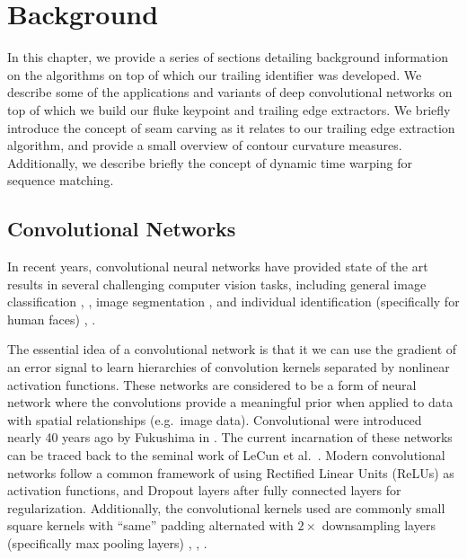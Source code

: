  
\chapter{Background} \label{sec:background}

In this chapter, we provide a series of sections detailing background information on the algorithms on top of which our trailing identifier was developed.
We describe some of the applications and variants of deep convolutional networks on top of which we build our fluke keypoint and trailing edge extractors.
We briefly introduce the concept of seam carving as it relates to our trailing edge extraction algorithm, and provide a small overview of contour curvature measures.
Additionally, we describe briefly the concept of dynamic time warping for sequence matching.

\section{Convolutional Networks}

In recent years, convolutional neural networks have provided state of the art results in several challenging computer vision tasks, including general image classification \cite{krizhevsky2012imagenet}, \cite{szegedy2015going}, image segmentation \cite{long2015fully}, \cite{chen2014semantic} and individual identification (specifically for human faces) \cite{fan2014learning}, \cite{schroff2015facenet}.

The essential idea of a convolutional network is that it we can use the gradient of an error signal to learn hierarchies of convolution kernels separated by nonlinear activation functions.
These networks are considered to be a form of neural network where the convolutions provide a meaningful prior when applied to data with spatial relationships (e.g.\ image data).
Convolutional were introduced nearly 40 years ago by Fukushima in \cite{fukushima1979neural}.
The current incarnation of these networks can be traced back to the seminal work of LeCun et al.\ \cite{lecun1998gradient}.
Modern convolutional networks follow a common framework of using Rectified Linear Units (ReLUs) as activation functions, and Dropout \cite{hinton2012improving} layers after fully connected layers for regularization. %
Additionally, the convolutional kernels used are commonly small square kernels with ``same'' padding alternated with $2\times$ downsampling layers (specifically max pooling layers) \cite{simonyan2014very}, \cite{sermanet2013overfeat}, \cite{krizhevsky2012imagenet}. %

